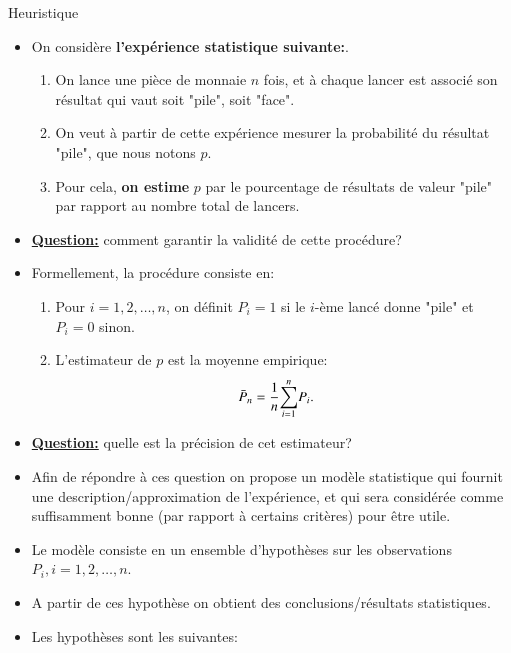 \begin{frame}[allowframebreaks]{Heuristique}
\begin{itemize}
    \item On considère \textbf{l'expérience statistique suivante:}.
    \begin{enumerate}[-]
        \item On lance une pièce de monnaie $n$ fois, et à chaque lancer est associé 
    son résultat qui vaut soit "pile", soit "face".
        \item On veut à partir de cette expérience mesurer la probabilité du résultat "pile", que nous notons $p$.
        \item Pour cela, \textbf{on estime} $p$ par le pourcentage de résultats de valeur "pile" par rapport au nombre total de lancers.
     \end{enumerate}
    \item \textbf{\underline{Question:}} comment garantir la validité de cette procédure?

\framebreak

    \item Formellement, la procédure consiste en:
    \begin{enumerate}[-]
    \item Pour $i=1, 2, \ldots, n$, on définit $P_i = 1$ si le $i$-ème lancé donne "pile" et $P_i=0$ sinon.
    \item L'estimateur de $p$ est la moyenne empirique:
    \begin{align*}
        \bar{P}_n &=\frac{1}{n}{\sum_{i=1}^n} P_i.
    \end{align*}
    \end{enumerate}
    \item \textbf{\underline{Question:}} quelle est la précision de cet estimateur?
    \item Afin de répondre à ces question on propose un modèle statistique qui fournit une description/approximation de l'expérience, et qui sera considérée comme suffisamment bonne
    (par rapport à certains critères) pour être utile.
    \framebreak

    \item Le modèle consiste en un ensemble  d'hypothèses sur les 
     observations $P_i, i=1, 2, \ldots, n$.
     \item  A partir de ces hypothèse on obtient des conclusions/résultats statistiques.

    \item Les hypothèses sont les suivantes:


\end{itemize}
\end{frame}
